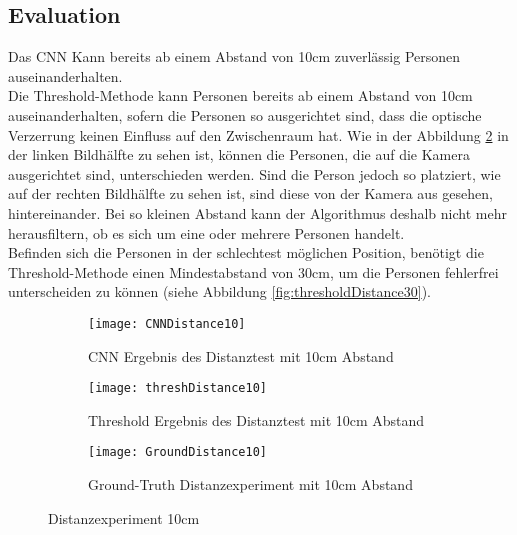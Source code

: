\subsection{Evaluation}


Das \gls{CNN} Kann bereits ab einem Abstand von 10cm zuverlässig Personen auseinanderhalten.\\
Die Threshold-Methode kann Personen bereits ab einem Abstand von 10cm auseinanderhalten, sofern die Personen so ausgerichtet sind, dass die optische Verzerrung keinen Einfluss auf den Zwischenraum hat. Wie in der Abbildung \ref{fig:thresholdDistance10} in der linken Bildhälfte zu sehen ist, können die Personen, die auf die Kamera ausgerichtet sind, unterschieden werden. Sind die Person jedoch so platziert, wie auf der rechten Bildhälfte zu sehen ist, sind diese von der Kamera aus gesehen, hintereinander. Bei so kleinen Abstand kann der Algorithmus deshalb nicht mehr herausfiltern, ob es sich um eine oder mehrere Personen handelt.\\
Befinden sich die Personen in der schlechtest möglichen Position, benötigt die Threshold-Methode einen Mindestabstand von 30cm, um die Personen fehlerfrei unterscheiden zu können (siehe Abbildung \ref{fig:thresholdDistance30}).

\begin{figure}[H]
	\begin{subfigure}{.45\linewidth}
		\centering
		\texttt{[image: CNNDistance10]}
		\caption{\gls{CNN} Ergebnis des Distanztest mit 10cm Abstand}
		\label{fig:cnnDistance10}
	\end{subfigure}\hfill%
	\begin{subfigure}{.45\linewidth}
		\centering
		\texttt{[image: threshDistance10]}
		\caption{Threshold Ergebnis des Distanztest mit 10cm Abstand}
		\label{fig:thresholdDistance10}
	\end{subfigure}\hfill
	\begin{subfigure}{\linewidth}
		\centering
		\texttt{[image: GroundDistance10]}
		\caption{Ground-Truth Distanzexperiment mit 10cm Abstand}
		\label{fig:groundDistance10}
	\end{subfigure}
	\caption{Distanzexperiment 10cm}
	\label{fig:Distance10}
\end{figure}

